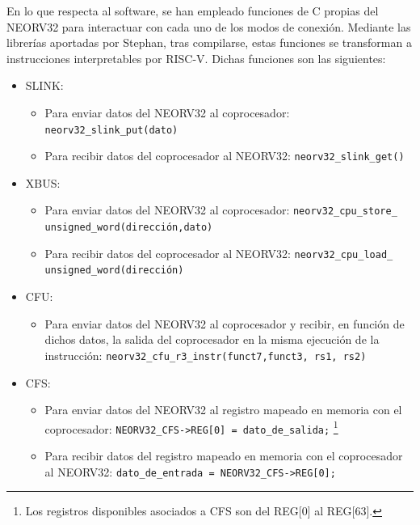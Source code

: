 En lo que respecta al software, se han empleado funciones de C propias del NEORV32 para interactuar con cada uno de los modos de conexión.
Mediante las librerías aportadas por Stephan, tras compilarse, estas funciones se transforman a instrucciones interpretables por RISC-V.
Dichas funciones son las siguientes:
\begin{itemize}
    \item SLINK:
        \begin{itemize}
            \item Para enviar datos del NEORV32 al coprocesador: \texttt{neorv32_slink_put(dato)} 
            \item Para recibir datos del coprocesador al NEORV32: \texttt{neorv32_slink_get()} 
        \end{itemize}
    \item XBUS:
        \begin{itemize}
            \item Para enviar datos del NEORV32 al coprocesador: \texttt{neorv32_cpu_store_}    \texttt{unsigned_word(dirección,dato)} 
            \item Para recibir datos del coprocesador al NEORV32: \texttt{neorv32_cpu_load_}   \texttt{unsigned_word(dirección)} 
        \end{itemize}
    \item CFU:
        \begin{itemize}
            \item Para enviar datos del NEORV32 al coprocesador y recibir, en función de dichos datos, la salida del coprocesador en la misma ejecución de la instrucción: \texttt{neorv32_cfu_r3_instr(funct7,funct3, rs1, rs2)} 
        \end{itemize}
    \item CFS:
        \begin{itemize}
            \item Para enviar datos del NEORV32 al registro mapeado en memoria con el coprocesador: \texttt{NEORV32_CFS->REG[0] = dato_de_salida;} \footnote{Los registros disponibles asociados a CFS son del REG[0] al REG[63].}
            \item Para recibir datos del registro mapeado en memoria con el coprocesador al NEORV32: \texttt{dato_de_entrada = NEORV32_CFS->REG[0];} 
        \end{itemize}
\end{itemize}

